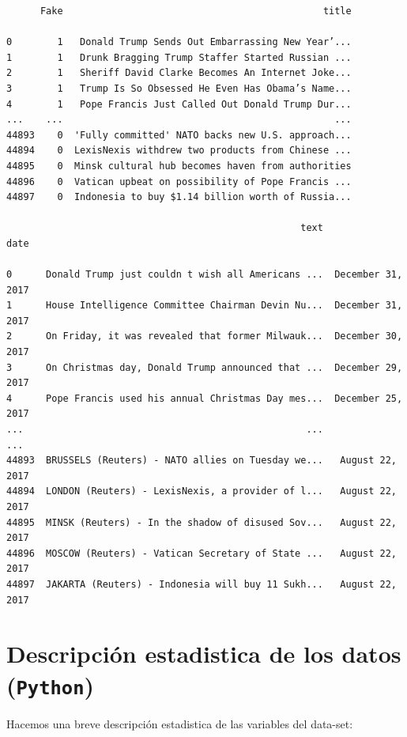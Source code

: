 \documentclass[
  11pt,
  a4paper,
]{article}
\begin{document}
\begin{verbatim}
      Fake                                              title  
      
0        1   Donald Trump Sends Out Embarrassing New Year’...   
1        1   Drunk Bragging Trump Staffer Started Russian ...   
2        1   Sheriff David Clarke Becomes An Internet Joke...   
3        1   Trump Is So Obsessed He Even Has Obama’s Name...   
4        1   Pope Francis Just Called Out Donald Trump Dur...   
...    ...                                                ...   
44893    0  'Fully committed' NATO backs new U.S. approach...   
44894    0  LexisNexis withdrew two products from Chinese ...   
44895    0  Minsk cultural hub becomes haven from authorities   
44896    0  Vatican upbeat on possibility of Pope Francis ...   
44897    0  Indonesia to buy $1.14 billion worth of Russia...   

                                                    text               date 
                                                    
0      Donald Trump just couldn t wish all Americans ...  December 31, 2017  
1      House Intelligence Committee Chairman Devin Nu...  December 31, 2017  
2      On Friday, it was revealed that former Milwauk...  December 30, 2017  
3      On Christmas day, Donald Trump announced that ...  December 29, 2017  
4      Pope Francis used his annual Christmas Day mes...  December 25, 2017  
...                                                  ...                ...  
44893  BRUSSELS (Reuters) - NATO allies on Tuesday we...   August 22, 2017   
44894  LONDON (Reuters) - LexisNexis, a provider of l...   August 22, 2017   
44895  MINSK (Reuters) - In the shadow of disused Sov...   August 22, 2017   
44896  MOSCOW (Reuters) - Vatican Secretary of State ...   August 22, 2017   
44897  JAKARTA (Reuters) - Indonesia will buy 11 Sukh...   August 22, 2017  
\end{verbatim}

\hypertarget{descripciuxf3n-estadistica-de-los-datos-python}{%
\section{\texorpdfstring{Descripción estadistica de los datos
(\texttt{Python})}{Descripción estadistica de los datos (Python)}}\label{descripciuxf3n-estadistica-de-los-datos-python}}

Hacemos una breve descripción estadistica de las variables del data-set:
\end{document}
